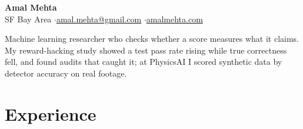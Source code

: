 \documentclass[10pt]{article}
\begin{document}
\fontsize{10}{11.3}\selectfont

\begin{center}
{\LARGE\bfseries Amal Mehta}\\[3pt]
SF Bay Area \quad$\cdot$\quad \href{mailto:amal.mehta@gmail.com}{amal.mehta@gmail.com} \quad$\cdot$\quad \href{https://amalmehta.com/}{amalmehta.com}
\end{center}

Machine learning researcher who checks whether a score measures what it claims. My reward-hacking study showed a test pass rate rising while true correctness fell, and found audits that caught it; at PhysicsAI I scored synthetic data by detector accuracy on real footage.

\section*{Experience}
\end{document}
